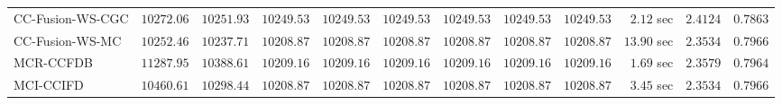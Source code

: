 \begin{table}[H]
\begin{tabular}{lrrrrrrrrrrr}
    CC-Fusion-WS-CGC & $     10272.06$ & $     10251.93$ & $     10249.53$ & $     10249.53$ & $     10249.53$ & $     10249.53$ & $     10249.53$ & $     10249.53$ & $         2.12$ sec    & $       2.4124$  & $       0.7863$ \\ 
     CC-Fusion-WS-MC & $     10252.46$ & $     10237.71$ & $     10208.87$ & $     10208.87$ & $     10208.87$ & $     10208.87$ & $     10208.87$ & $     10208.87$ & $        13.90$ sec    & $       2.3534$  & $       0.7966$ \\ 
\cmidrule{1-1} 
           MCR-CCFDB & $     11287.95$ & $     10388.61$ & $     10209.16$ & $     10209.16$ & $     10209.16$ & $     10209.16$ & $     10209.16$ & $     10209.16$ & $         1.69$ sec    & $       2.3579$  & $       0.7964$ \\ 
\cmidrule{1-1} 
           MCI-CCIFD & $     10460.61$ & $     10298.44$ & $     10208.87$ & $     10208.87$ & $     10208.87$ & $     10208.87$ & $     10208.87$ & $     10208.87$ & $         3.45$ sec    & $       2.3534$  & $       0.7966$ \\ 
\bottomrule
\end{tabular}
\end{table}


